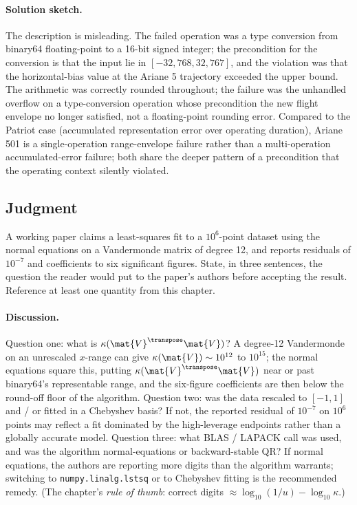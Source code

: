\paragraph{Solution sketch.}
The description is misleading. The failed operation was a
type conversion from binary64 floating-point to a 16-bit signed
integer; the precondition for the conversion is that the input
lie in $[-32{,}768, 32{,}767]$, and the violation was that the
horizontal-bias value at the Ariane 5 trajectory exceeded the
upper bound. The arithmetic was correctly rounded throughout; the
failure was the unhandled overflow on a type-conversion operation
whose precondition the new flight envelope no longer satisfied,
not a floating-point rounding error. Compared to the Patriot case
(accumulated representation error over operating duration), Ariane
501 is a single-operation range-envelope failure rather than a
multi-operation accumulated-error failure; both share the deeper
pattern of a precondition that the operating context silently
violated.

\subsection*{Judgment}

\begin{exercise}
A working paper claims a least-squares fit to a $10^{6}$-point
dataset using the normal equations on a Vandermonde matrix of
degree 12, and reports residuals of $10^{-7}$ and coefficients to
six significant figures. State, in three sentences, the question
the reader would put to the paper's authors before accepting the
result. Reference at least one quantity from this chapter.
\end{exercise}

\paragraph{Discussion.}
Question one: what is $\kappa(\mat{V}^{\transpose}\mat{V})$? A
degree-12 Vandermonde on an unrescaled $x$-range can give
$\kappa(\mat{V}) \sim 10^{12}$ to $10^{15}$; the normal equations
square this, putting $\kappa(\mat{V}^{\transpose}\mat{V})$ near or
past binary64's representable range, and the six-figure
coefficients are then below the round-off floor of the algorithm.
Question two: was the data rescaled to $[-1, 1]$ and / or fitted
in a Chebyshev basis? If not, the reported residual of $10^{-7}$
on $10^{6}$ points may reflect a fit dominated by the
high-leverage endpoints rather than a globally accurate model.
Question three: what BLAS / LAPACK call was used, and was the
algorithm normal-equations or backward-stable QR? If normal
equations, the authors are reporting more digits than the
algorithm warrants; switching to \texttt{numpy.linalg.lstsq} or
to Chebyshev fitting is the recommended remedy. (The chapter's
\emph{rule of thumb}: correct digits $\approx \log_{10}(1/u)
- \log_{10} \kappa$.)

